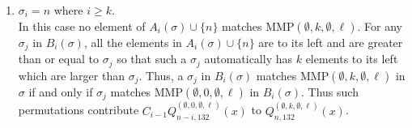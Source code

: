 \documentclass[
final,nomarks
]{dmtcs-episciences}
\newcommand{\Qmmn}[2]{Q_{#2,132}^{(#1)}(x)}
\newcommand{\MMP}{\mathrm{MMP}}
\begin{document}
\begin{enumerate}[{\bf Case }\bf 1.]
	\item \begin{math}\sigma_i =n\end{math} where \begin{math}i \geq k\end{math}.\\
	In this case no element of \begin{math}A_i(\sigma) \cup \{n\}\end{math} matches \begin{math}\MMP(\emptyset,k,\emptyset,\ell)\end{math}.
	For any \begin{math}\sigma_j\end{math} in \begin{math}B_i(\sigma)\end{math}, all the elements in \begin{math}A_i(\sigma) \cup \{n\}\end{math} are to its 
	left and are greater than or equal to \begin{math}\sigma_j\end{math} so that such a \begin{math}\sigma_j\end{math} automatically has 
	\begin{math}k\end{math} elements to its left which are larger than \begin{math}\sigma_j\end{math}. Thus, 
	a \begin{math}\sigma_j\end{math} in \begin{math}B_i(\sigma)\end{math} matches \begin{math}\MMP(\emptyset,k,\emptyset,\ell)\end{math} 
	in \begin{math}\sigma\end{math} if and only if \begin{math}\sigma_j\end{math}  matches \begin{math}\MMP(\emptyset,0,\emptyset,\ell)\end{math} 
	in \begin{math}B_i(\sigma)\end{math}. Thus such permutations contribute \begin{math}C_{i-1}\Qmmn{\emptyset,0,\emptyset,\ell}{n-i}\end{math} to 
	\begin{math}\Qmmn{\emptyset,k,\emptyset,\ell}{n}\end{math}.
	
\end{enumerate}
\end{document}
